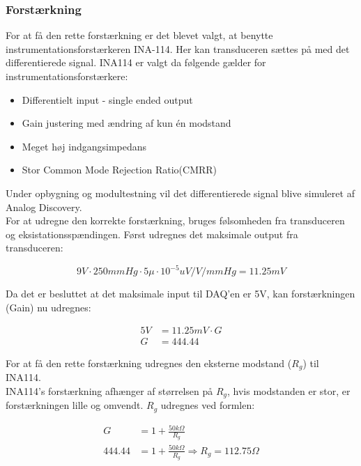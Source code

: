 \subsubsection{Forstærkning}
For at få den rette forstærkning er det blevet valgt, at benytte instrumentationsforstærkeren INA-114. Her kan transduceren sættes på med det differentierede signal. INA114 er valgt da følgende gælder\cite{Instrumentation} for instrumentationsforstærkere: 
\begin{itemize}
	\item Differentielt input - single ended output 
	\item Gain justering med ændring af kun én modstand 
	\item Meget høj indgangsimpedans 
	\item Stor Common Mode Rejection Ratio(CMRR)
\end{itemize}
Under opbygning og modultestning vil det differentierede signal blive simuleret af Analog Discovery. \\
For at udregne den korrekte forstærkning, bruges følsomheden fra transduceren og eksistationsspændingen.
Først udregnes det maksimale output fra transduceren: 
\begin{ceqn}  
\begin{equation}
9V\cdot 250mmHg \cdot 5\mu\cdot 10^{-5} uV/V/mmHg  = 11.25mV
\end{equation}
\end{ceqn}
Da det er besluttet at det maksimale input til DAQ'en \cite{DSB} er 5V, kan forstærkningen (Gain) nu udregnes:
\begin{ceqn}
\begin{equation}
\begin{split}
5V& =11.25mV\cdot G\\   
G& =444.44
\end{split}
\end{equation}
\end{ceqn}
\cite{INA} For at få den rette forstærkning udregnes den eksterne modstand ($ R_g $) til INA114.\\ 
INA114's forstærkning afhænger af størrelsen på $ R_g $, hvis modstanden er stor, er forstærkningen lille og omvendt.  $ R_g $ udregnes ved formlen:
\begin{ceqn}
\begin{equation}
\begin{split}
G&=1+\frac{50k\Omega}{R_g}\\
444.44&= 1+\frac{50k\Omega}{R_g} \Rightarrow R_g= 112.75 \Omega
\end{split}
\end{equation}
\end{ceqn}
